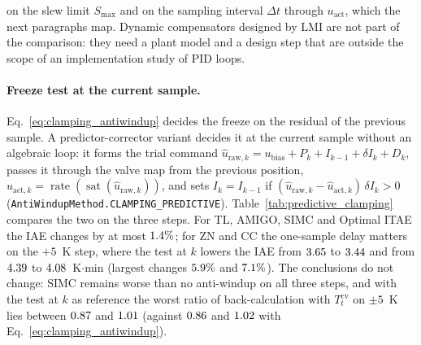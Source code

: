 \documentclass[11pt]{article}
\begin{document}
on the slew limit $S_{\max}$ and on the sampling interval $\Delta t$ through $u_{\text{act}}$, which the next paragraphs map. Dynamic compensators designed by LMI \cite{galeani2009tutorial, lerch2021antiwindup} are not part of the comparison: they need a plant model and a design step that are outside the scope of an implementation study of PID loops.





\paragraph{Freeze test at the current sample.} Eq.~\eqref{eq:clamping_antiwindup} decides the freeze on the residual of the previous sample. A predictor-corrector variant decides it at the current sample without an algebraic loop: it forms the trial command $\hat u_{\text{raw},k} = u_{\text{bias}} + P_k + I_{k-1} + \delta I_k + D_k$, passes it through the valve map from the previous position, $\hat u_{\text{act},k} = \operatorname{rate}(\operatorname{sat}(\hat u_{\text{raw},k}))$, and sets $I_k = I_{k-1}$ if $(\hat u_{\text{raw},k} - \hat u_{\text{act},k})\,\delta I_k > 0$ (\texttt{AntiWindupMethod.CLAMPING\_PREDICTIVE}). Table~\ref{tab:predictive_clamping} compares the two on the three steps. For TL, AMIGO, SIMC and Optimal ITAE the IAE changes by at most $1.4\%$; for ZN and CC the one-sample delay matters on the $+5$~K step, where the test at $k$ lowers the IAE from $3.65$ to $3.44$ and from $4.39$ to $4.08$~K$\cdot$min (largest changes $5.9\%$ and $7.1\%$). The conclusions do not change: SIMC remains worse than no anti-windup on all three steps, and with the test at $k$ as reference the worst ratio of back-calculation with $T_t^{\mathrm{cv}}$ on $\pm 5$~K lies between $0.87$ and $1.01$ (against $0.86$ and $1.02$ with Eq.~\eqref{eq:clamping_antiwindup}).


\end{document}
